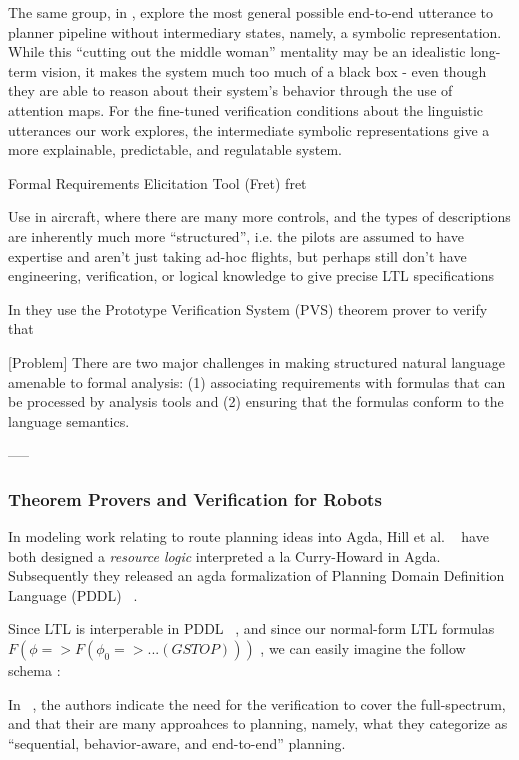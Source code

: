 \documentclass[a4paper, 11pt]{article}
\begin{document}
The same group, in \cite{kuo2020deep}, explore the most general possible
end-to-end utterance to planner pipeline without intermediary states, namely, a
symbolic representation. While this ``cutting out the middle woman'' mentality
may be an idealistic long-term vision, it makes the system much too much of a
black box - even though they are able to reason about their system's behavior
through the use of attention maps. For the fine-tuned verification conditions
about the linguistic utterances our work explores, the intermediate symbolic
representations give a more explainable, predictable, and regulatable system.


Formal Requirements Elicitation Tool (Fret) {fret}

Use in aircraft, where there are many more controls, and the types of
descriptions are inherently much more ``structured'', i.e. the pilots are
assumed to have expertise and aren't just taking ad-hoc flights, but perhaps
still don't have engineering, verification, or logical knowledge to give precise
LTL specifications

In \cite{fret} they use the Prototype Verification System (PVS) theorem prover
to verify that 

[Problem] There are two major challenges in making structured natural language
amenable to formal analysis: (1) associating requirements with formulas that can
be processed by analysis tools and (2) ensuring that the formulas conform to the
language semantics. \cite{fretish}

----- 

\subsubsection{Theorem Provers and Verification for Robots}

In modeling work relating to route planning ideas into Agda, Hill et al.
~\cite{hillResource} have both designed a \emph{resource logic} interpreted a la
Curry-Howard in Agda. Subsequently they released  an agda formalization of
Planning Domain Definition Language (PDDL) ~\cite{hillAction}.

Since LTL is interperable in PDDL
~\cite{ltlPDDL}, and since our normal-form LTL formulas $F (\phi => F (\phi_0 => ... (G STOP)))$
, we can easily imagine the follow schema :

In ~\cite{planningForAV}, the authors indicate the need for the verification to
cover the full-spectrum, and that their are many approahces to planning, namely,
what they categorize as ``sequential, behavior-aware, and end-to-end'' planning.
\end{document}
